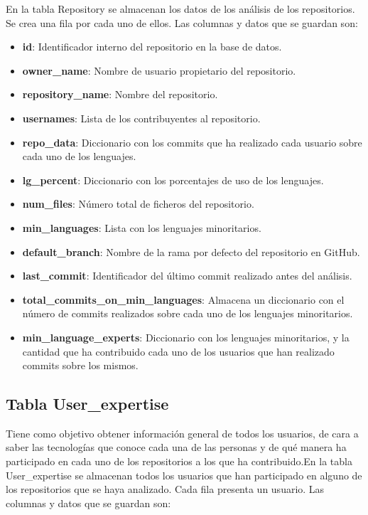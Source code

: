 \documentclass[a4paper, 12pt]{book}
\begin{document}
En la tabla Repository se almacenan los datos de los análisis de los repositorios. Se crea una fila por cada uno de ellos. Las columnas y datos que se guardan son:
\begin{itemize}
  \item \textbf{id}: Identificador interno del repositorio en la base de datos.
  \item \textbf{owner\_name}: Nombre de usuario propietario del repositorio.
  \item \textbf{repository\_name}: Nombre del repositorio.
  \item \textbf{usernames}: Lista de los contribuyentes al repositorio.
  \item \textbf{repo\_data}: Diccionario con los commits que ha realizado cada usuario sobre cada uno de los lenguajes.
  \item \textbf{lg\_percent}: Diccionario con los porcentajes de uso de los lenguajes.
  \item \textbf{num\_files}: Número total de ficheros del repositorio.
  \item \textbf{min\_languages}: Lista con los lenguajes minoritarios.
  \item \textbf{default\_branch}: Nombre de la rama por defecto del repositorio en GitHub.
  \item \textbf{last\_commit}: Identificador del último commit realizado antes del análisis.
  \item \textbf{total\_commits\_on\_min\_languages}: Almacena un diccionario con el número de commits realizados sobre cada uno de los lenguajes minoritarios.
  \item \textbf{min\_language\_experts}: Diccionario con los lenguajes minoritarios, y la cantidad que ha contribuido cada uno de los usuarios que han realizado commits sobre los mismos.
\end{itemize}

\subsection{Tabla User\_expertise}
\label{subsec:Tabla User\_expertise}

Tiene como objetivo obtener información general de todos los usuarios, de cara a saber las tecnologías que conoce cada una de las personas y de qué manera ha participado en cada uno de los repositorios a los que ha contribuido.En la tabla User\_expertise se almacenan todos los usuarios que han participado en alguno de los repositorios que se haya analizado. Cada fila presenta un usuario. Las columnas y datos que se guardan son:
\end{document}
